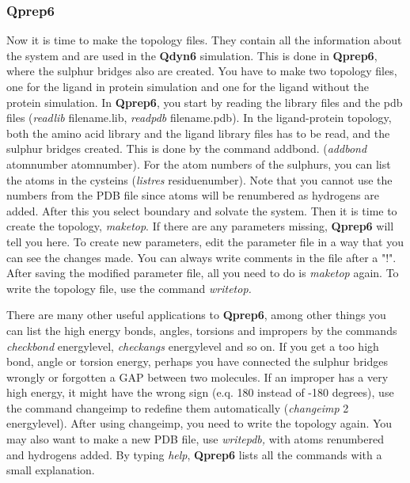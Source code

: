 \documentclass[a4paper,11pt]{article}
\begin{document}
\subsubsection{\textbf{Qprep6}}
Now  it is  time to  make  the topology  files. They  contain all  the
information  about  the  system  and are  used  in  the  \textbf{Qdyn6}
simulation.  This is done in \textbf{Qprep6}, where the sulphur bridges
also are  created.  You have to  make two topology files,  one for the
ligand  in protein  simulation  and  one for  the  ligand without  the
protein  simulation.   In \textbf{Qprep6},  you  start  by reading  the
library  files  and  the  pdb  files  (\textit{readlib  }filename.lib,
\textit{readpdb }filename.pdb).  In the ligand-protein  topology, both
the amino  acid library and the  ligand library files has  to be read,
and  the  sulphur  bridges  created.  This  is  done  by  the  command
addbond.  (\textit{addbond  }atomnumber   atomnumber).  For  the  atom
numbers  of the  sulphurs,  you can  list the  atoms  in the  cysteins
(\textit{listres }residuenumber). Note that you cannot use the numbers
from the  PDB file  since atoms  will be  renumbered as  hydrogens are
added. After this you select boundary  and solvate the system. Then it
is time  to create  the topology, \textit{maketop}.  If there  are any
parameters missing, \textbf{Qprep6}  will tell you here.  To create new
parameters, edit  the parameter  file in  a way that  you can  see the
changes  made. You  can  always write  comments in  the  file after  a
"!". After saving  the modified parameter file, all you  need to do is
\textit{maketop }again.  To write the  topology file, use  the command
\textit{writetop.}

There  are many  other  useful applications  to \textbf{Qprep6},  among
other things you can list the  high energy bonds, angles, torsions and
impropers    by   the    commands   \textit{checkbond    }energylevel,
\textit{checkangs }energylevel and so on. If  you get a too high bond,
angle  or  torsion energy,  perhaps  you  have connected  the  sulphur
bridges  wrongly or  forgotten a  GAP  between two  molecules.  If  an
improper  has  a very  high  energy,  it  might  have the  wrong  sign
(e.q.  180 instead  of -180  degrees),  use the  command changeimp  to
redefine them automatically (\textit{changeimp} 2 energylevel).  After
using changeimp,  you need to write  the topology again. You  may also
want  to  make a  new  PDB  file,  use \textit{writepdb,  }with  atoms
renumbered   and    hydrogens   added.   By    typing   \textit{help},
\textbf{Qprep6} lists all the commands with a small explanation.
\end{document}
